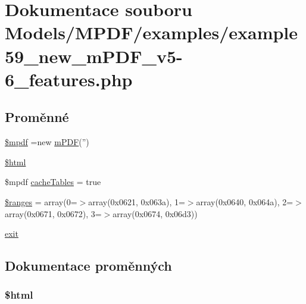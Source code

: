 \hypertarget{example59__new__m_p_d_f__v5-6__features_8php}{\section{Dokumentace souboru Models/\-M\-P\-D\-F/examples/example59\-\_\-new\-\_\-m\-P\-D\-F\-\_\-v5-\/6\-\_\-features.php}
\label{example59__new__m_p_d_f__v5-6__features_8php}
}
\subsection*{Proměnné}
\begin{DoxyCompactItemize}
\item 
\hyperlink{example59__new__m_p_d_f__v5-6__features_8php_ad028f81910d6cbab9b184d2214b3a8f8}{\$mpdf} =new \hyperlink{classm_p_d_f}{m\-P\-D\-F}('')
\item 
\hyperlink{example59__new__m_p_d_f__v5-6__features_8php_a6f96e7fc92441776c9d1cd3386663b40}{\$html}
\item 
\$mpdf \hyperlink{example59__new__m_p_d_f__v5-6__features_8php_a481460886a3bc9dd04ebf14a7d7ddcc1}{cache\-Tables} = true
\item 
\hyperlink{example59__new__m_p_d_f__v5-6__features_8php_a48d8618605882fed58f79aecd7d06d5a}{\$ranges} = array(0=$>$array(0x0621, 0x063a), 1=$>$array(0x0640, 0x064a), 2=$>$array(0x0671, 0x0672), 3=$>$array(0x0674, 0x06d3))
\item 
\hyperlink{example59__new__m_p_d_f__v5-6__features_8php_a6733eb5f605d09eaede9845835d71c4e}{exit}
\end{DoxyCompactItemize}


\subsection{Dokumentace proměnných}
\hypertarget{example59__new__m_p_d_f__v5-6__features_8php_a6f96e7fc92441776c9d1cd3386663b40}{
\subsubsection[{\$html}]{\setlength{\rightskip}{0pt plus 5cm}\$html}}\label{example59__new__m_p_d_f__v5-6__features_8php_a6f96e7fc92441776c9d1cd3386663b40}


